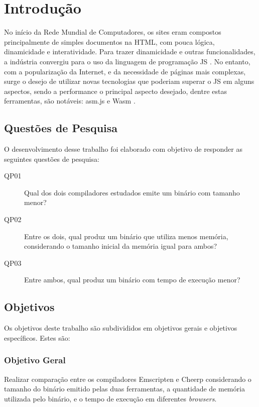 \chapter{Introdução}\label{cap1}

No início da Rede Mundial de Computadores, os sites eram compostos principalmente de simples documentos na \Gls{HTML}, com pouca lógica, dinamicidade e interatividade. Para trazer dinamicidade e outras funcionalidades, a indústria convergiu para o uso da linguagem de programação \Gls{JS} \cite{rise_of_js}. No entanto, com a popularização da Internet, e da necessidade de páginas mais complexas, surge o desejo de utilizar novas tecnologias que poderiam superar o JS em alguns aspectos, sendo a performance o principal aspecto desejado, dentre estas ferramentas, são notáveis: asm.js e \Gls{Wasm} \cite{wasm_predecessors}.

\section{Questões de Pesquisa}

O desenvolvimento desse trabalho foi elaborado com objetivo de responder as seguintes questões de pesquisa:

\begin{description}
    \item[QP01] Qual dos dois compiladores estudados emite um binário com tamanho menor?
    \item[QP02] Entre os dois, qual produz um binário que utiliza menos memória, considerando o tamanho inicial da memória igual para ambos?
    \item[QP03] Entre ambos, qual produz um binário com tempo de execução menor?
\end{description}

\section{Objetivos}

Os objetivos deste trabalho são subdivididos em objetivos gerais e objetivos específicos. Estes são:

\subsection{Objetivo Geral}

Realizar comparação entre os compiladores Emscripten e Cheerp considerando o tamanho do binário emitido pelas duas ferramentas, a quantidade de memória utilizada pelo binário, e o tempo de execução em diferentes \textit{browsers}.

